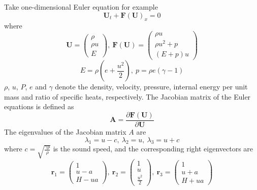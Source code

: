 Take one-dimensional Euler equation  for example
\begin{equation}
\mathbf{U}_{t}+\mathbf{F}\left(\mathbf{U}\right)_{x} = 0
\label{eqn:1d_Euler}
\end{equation}
where 
\begin{equation}
\mathbf{U} = 
\left(
\begin{array}{c}
\rho\\ \rho u\\ E
\end{array}
\right),\ 
\mathbf{F}(\mathbf{U}) = 
\left(
\begin{array}{c}
\rho u\\ \rho u^{2}+p\\ (E+p)u
\end{array}
\right)
\end{equation}
\begin{equation}
E = \rho (e+\frac{u^{2}}{2}),\ p = \rho e (\gamma - 1)
\end{equation}
$\rho$, $u$, $P$, $e$ and $\gamma$ denote the density, velocity,
pressure, internal energy per unit mass and ratio of specific heats,
respectively. The Jacobian matrix of the Euler equations is defined as 
\begin{equation}
\mathbf{A} = \frac{\partial \mathbf{F}(\mathbf{U})}{\partial \mathbf{U}}
\end{equation}
The eigenvalues of the Jacobian matrix $A$ are 
\begin{equation}
\lambda_{1} = u-c,\ \lambda_{2}=u,\ \lambda_{3}=u+c
\end{equation}
where $c=\sqrt{\frac{\gamma p}{\rho}}$ is the sound speed, and the
corresponding right eigenvectors are 
\begin{equation}
\mathbf{r}_{1} = 
\left(
\begin{array}{c}
1\\ u-a\\ H-ua
\end{array}
\right),\ 
\mathbf{r}_{2} = 
\left(
\begin{array}{c}
1\\ u\\ \frac{u^{2}}{2}
\end{array}
\right),\ 
\mathbf{r}_{3} = 
\left(
\begin{array}{c}
1\\ u + a\\ H + u a
\end{array}
\right)
\label{eqn:Euler_eigvec}
\end{equation}
